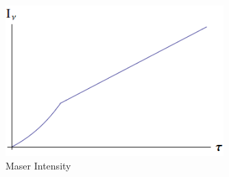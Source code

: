\documentclass{article}
\begin{document}
\begin{figure}
    \centering
    \includegraphics[width=0.75\textwidth]{figures/MaserIntensity.png}
    \caption{Maser Intensity}
    \label{fig:maserintensity}
\end{figure}
\end{document}
